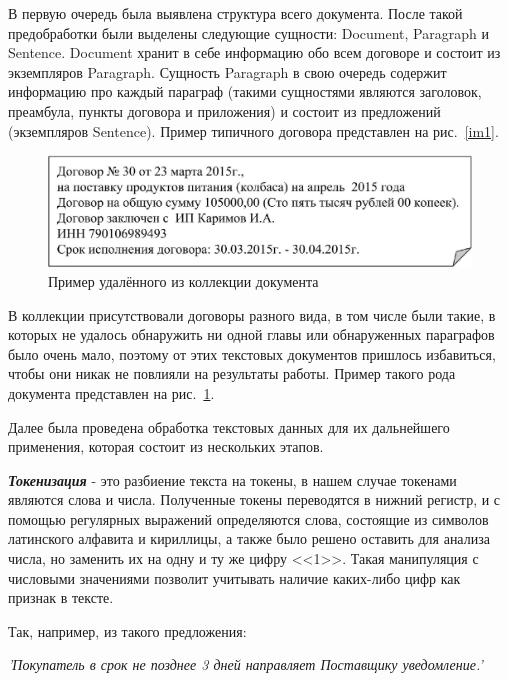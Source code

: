 \documentclass[12pt]{article}
\begin{document}
В первую очередь была выявлена структура всего документа. После такой предобработки были выделены следующие сущности: Document, Paragraph и Sentence. Document хранит в себе информацию обо всем договоре и состоит из экземпляров Paragraph. Сущность Paragraph в свою очередь содержит информацию про каждый параграф (такими сущностями являются заголовок, преамбула, пункты договора и приложения) и состоит из предложений (экземпляров Sentence). Пример типичного договора представлен на рис.~\ref{im1}. 

\vspace{5pt}
\begin{figure}[h!]
	\includegraphics[scale=0.74]{images/im2.eps}
	\caption{Пример удалённого из коллекции документа}
	\label{im2}
\end{figure}
\vspace{5pt}

В коллекции присутствовали договоры разного вида, в том числе были такие, в которых не удалось обнаружить ни одной главы или обнаруженных параграфов было очень мало, поэтому от этих текстовых документов пришлось избавиться, чтобы они никак не повлияли на результаты работы. Пример такого рода документа представлен на рис.~\ref{im2}.

Далее была проведена обработка текстовых данных для их дальнейшего применения, которая состоит из нескольких этапов.

\vspace{5pt}
\textbf{\textit{Токенизация}} - это разбиение текста на токены, в нашем случае токенами являются слова и числа. Полученные токены переводятся в нижний регистр, и с помощью регулярных выражений определяются  слова, состоящие из символов латинского алфавита и кириллицы,  а также было решено оставить для анализа числа, но заменить их на одну и ту же цифру <<1>>. Такая манипуляция с числовыми значениями позволит учитывать наличие каких-либо цифр как признак в тексте. 

\vspace{20pt}
Так, например, из такого предложения:

\vspace{13pt}
\noindent\textit{'Покупатель в срок не позднее 3 дней направляет Поставщику уведомление.'}
\end{document}
